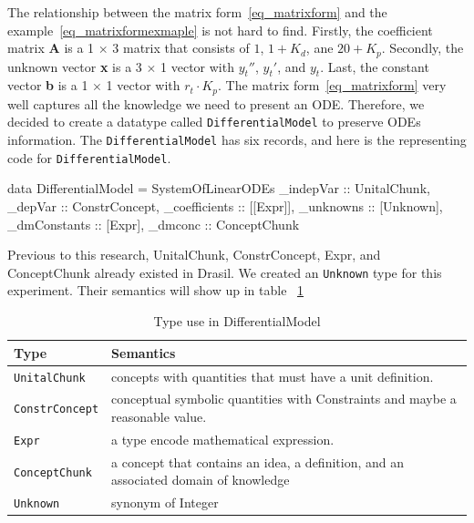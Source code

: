 The relationship between the matrix form~\ref{eq_matrixform} and the example~\ref{eq_matrixformexmaple} is not hard to find. Firstly, the coefficient matrix \textbf{A} is a 1 $\times$ 3 matrix that consists of $1$, $1 + K_d$, ane $20 + K_p$. Secondly, the unknown vector \textbf{x} is a 3 $\times$ 1 vector with $y_t''$, $y_t'$, and $y_t$. Last, the constant vector \textbf{b} is a 1 $\times$ 1 vector with $r_t \cdot K_p$. The matrix form~\ref{eq_matrixform} very well captures all the knowledge we need to present an ODE. Therefore, we decided to create a datatype called \verb|DifferentialModel| to preserve ODEs information. The \verb|DifferentialModel| has six records, and here is the representing code for \verb|DifferentialModel|.
\begin{haskell1}
data DifferentialModel = SystemOfLinearODEs {
	_indepVar :: UnitalChunk,
	_depVar :: ConstrConcept,
	_coefficients :: [[Expr]],
	_unknowns :: [Unknown],
	_dmConstants :: [Expr],
	_dmconc :: ConceptChunk
}
\end{haskell1}

Previous to this research, UnitalChunk, ConstrConcept, Expr, and ConceptChunk already existed in Drasil. We created an \verb|Unknown| type for this experiment. Their semantics will show up in table ~\ref{tab_demodeltype}

\begin{table}[ht]
	\begin{tabular}{ p{} p{} }
		\textbf{Type} & \textbf{Semantics} \\
		\toprule
		\verb|UnitalChunk| & concepts with quantities that must have a unit definition.\\
		\verb|ConstrConcept| & conceptual symbolic quantities with Constraints and maybe a reasonable value.\\
		\verb|Expr| & a type encode mathematical expression. \\
		\verb|ConceptChunk| & a concept that contains an idea, a definition, and an associated domain of knowledge\\
        \verb|Unknown|& synonym of Integer\\
		\bottomrule	
	\end{tabular}	
	\caption{Type use in DifferentialModel}	
	\label{tab_demodeltype}
\end{table}

